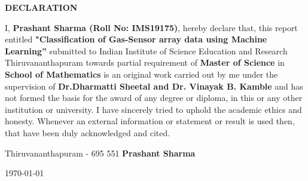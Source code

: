  \setcounter{page}{2}
\begin{center}
{\Large{\bf{DECLARATION}}}
\end{center}

\noindent

I, \textbf{Prashant Sharma (Roll No: IMS19175)}, hereby declare that, this report entitled \textbf{"Classification of Gas-Sensor array data using
Machine Learning”} submitted to Indian Institute of Science Education and Research Thiruvananthapuram towards partial requirement of \textbf{Master of Science} in \textbf{School of Mathematics} is an original work carried out by me under the supervision of \textbf{Dr.Dharmatti Sheetal and Dr. Vinayak B. Kamble} and has not formed the basis for the award of any degree or diploma, in this or any other institution or university. I have sincerely tried to uphold the academic ethics and honesty. Whenever an external information or statement or result is used then, that have been duly acknowledged and cited.

\vspace{4cm} %

\noindent Thiruvananthapuram - 695 551 \hfill \textbf{Prashant Sharma}

\noindent \today \hfill

\clearpage
